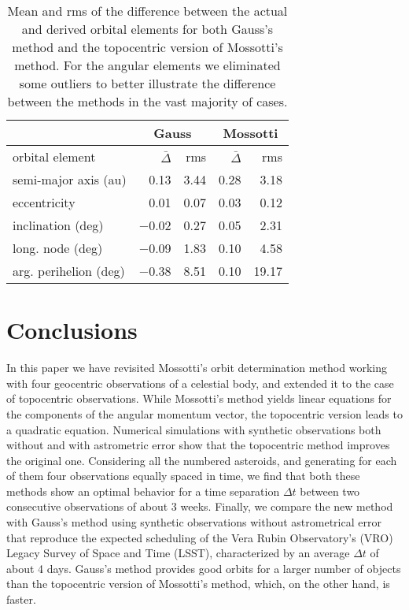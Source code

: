 \documentclass[11pt]{article}
\begin{document}
\begin{table}[ht!]
    \centering
    \begin{tabular}{|l|r|r|r|r|}
        \hline
        & \multicolumn{2}{|c|}{Gauss}  & \multicolumn{2}{|c|}{Mossotti} \\
        \hline
        orbital element        & $\bar\Delta$  &   rms  & $\bar\Delta$ & rms  \\
        \hline
        semi-major axis (au)   &    0.13  &   3.44  &   0.28  &   3.18  \\
        eccentricity           &    0.01  &   0.07  &   0.03  &   0.12  \\
        inclination (deg)      & $-$0.02  &   0.27  &   0.05  &   2.31  \\
        long. node (deg)       & $-$0.09  &   1.83  &   0.10  &   4.58  \\
        arg. perihelion (deg)  & $-$0.38  &   8.51  &   0.10  &  19.17  \\
        \hline
    \end{tabular}
    \caption{Mean and rms of the difference between the actual and  derived orbital elements for both Gauss's method and the topocentric version of Mossotti's method. 
    For the angular elements we eliminated some outliers to better illustrate the difference between the methods in the vast majority of cases.}
    \label{tab:gauss-mossotti-comparison}
\end{table}



\section{Conclusions}
In this paper we have revisited Mossotti's orbit determination method working with four geocentric observations of a celestial body, and extended it to the case of topocentric observations. 
While Mossotti's method yields linear equations for the components of the angular momentum vector, the topocentric version leads to a quadratic
equation. 
Numerical simulations with synthetic observations both without and with astrometric error show that the topocentric method improves the original one. 
Considering all the numbered asteroids, and generating for each of them four observations equally spaced in time, we find that both these methods show an optimal behavior for a time separation $\Delta t$ between two consecutive observations of about 3 weeks. 
Finally, we compare the new method with Gauss's method using synthetic observations without astrometrical error that reproduce the expected scheduling of the Vera Rubin Observatory's (VRO) Legacy Survey of Space and Time (LSST), characterized by an average $\Delta t$ of about 4 days. 
Gauss's method provides good orbits for a larger number of objects than the topocentric version of Mossotti's method, which, on the other hand, is faster.
\end{document}
